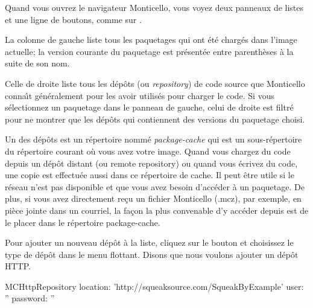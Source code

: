 \documentclass[a4paper,10pt,twoside]{book}
\begin{document}
Quand vous ouvrez le navigateur Monticello, vous voyez deux panneaux
de listes et une ligne de boutons, comme sur .

La colonne de gauche liste tous les paquetages qui ont \'et\'e charg\'es
dans l'image actuelle; la version courante du paquetage est
pr\'esent\'ee entre parenth\`eses \`a la suite de son nom.

Celle de droite liste tous les d\'ep\^ots (ou \emph{repository}) de code
source que Monticello conna\^{\i}t g\'en\'eralement pour les avoir utilis\'es
pour charger le code. Si vous s\'electionnez un paquetage dans le panneau de 
gauche, celui de droite est filtr\'e pour ne montrer que les d\'ep\^ots
qui contiennent des versions du paquetage choisi.

Un des d\'ep\^ots est un r\'epertoire nomm\'e \emph{package-cache} qui
est un sous-r\'epertoire du r\'epertoire courant o\`u vous avez
votre image.
Quand vous chargez du code depuis un d\'ep\^ot distant (ou remote repository)
ou quand vous \'ecrivez du code, une copie est effectu\'ee aussi dans ce
r\'epertoire de cache. Il peut \^etre utile si le r\'eseau n'est pas 
disponible et que vous avez besoin d'acc\'eder \`a un paquetage. De plus,
si vous avez directement re\c{c}u un fichier Monticello (.mcz), par exemple, 
en pi\`{e}ce jointe dans un courriel, la fa\c{c}on la plus convenable d'y acc\'eder
depuis \pharo est de le placer dans le r\'epertoire package-cache.

Pour ajouter un nouveau d\'ep\^ot \`a la liste, cliquez sur le bouton 
 et choisissez le type de d\'ep\^ot dans le menu
flottant. Disons que nous voulons ajouter un d\'ep\^ot HTTP.

\begin{code}{}
MCHttpRepository
	location: 'http://squeaksource.com/SqueakByExample'
	user: ''
	password: ''
\end{code}
\end{document}
